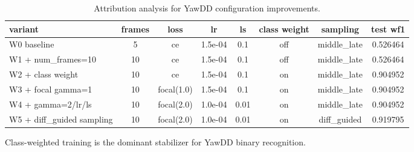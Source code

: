 \begin{table}[t]
\centering
\small
\begin{tabular}{lccccccc}
\toprule
variant & frames & loss & lr & ls & class weight & sampling & test wf1 \\
\midrule
W0 baseline & 5 & ce & 1.5e-04 & 0.1 & off & middle_late & 0.526464 \\
W1 + num_frames=10 & 10 & ce & 1.5e-04 & 0.1 & off & middle_late & 0.526464 \\
W2 + class weight & 10 & ce & 1.5e-04 & 0.1 & on & middle_late & 0.904952 \\
W3 + focal gamma=1 & 10 & focal(1.0) & 1.5e-04 & 0.1 & on & middle_late & 0.904952 \\
W4 + gamma=2/lr/ls & 10 & focal(2.0) & 1.0e-04 & 0.01 & on & middle_late & 0.904952 \\
W5 + diff_guided sampling & 10 & focal(2.0) & 1.0e-04 & 0.01 & on & diff_guided & 0.919795 \\
\bottomrule
\end{tabular}
\vspace{2pt}\footnotesize Class-weighted training is the dominant stabilizer for YawDD binary recognition.
\caption{Attribution analysis for YawDD configuration improvements.}
\label{tab:yawdd_attribution}
\end{table}
